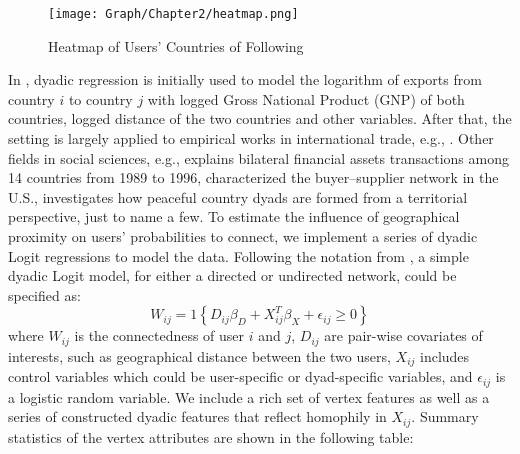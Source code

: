 \begin{figure} \centering
  \caption{Heatmap of Users' Countries of Following}
  \texttt{[image: Graph/Chapter2/heatmap.png]}
\end{figure}

In \cite{tinbergen1962shaping}, dyadic regression is initially used to model the logarithm of exports from country $i$ to country $j$ with logged Gross National Product (GNP) of both countries, logged distance of the two countries and other variables. After that, the setting is largely applied to empirical works in international trade, e.g., \cite{anderson2011gravity, rose2004we}. Other fields in social sciences, e.g., \cite{portes2005determinants} explains bilateral financial assets transactions among 14 countries from 1989 to 1996, \cite{atalay2011network} characterized the buyer–supplier network in the U.S., \cite{owsiak2021peaceful} investigates how peaceful country dyads are formed from a territorial perspective, just to name a few. To estimate the influence of geographical proximity on users' probabilities to connect, we implement a series of dyadic Logit regressions to model the data. Following the notation from \cite{de2020econometric}, a simple dyadic Logit model, for either a directed or undirected network, could be specified as:
\begin{equation}
  \nonumber
  W_{ij}=1\left\{ D_{ij} \beta_D + X_{ij}^T \beta_X + \epsilon_{ij} \geq 0 \right\}
\end{equation}
where $W_{ij}$ is the connectedness of user $i$ and $j$, $D_{ij}$ are pair-wise covariates of interests, such as geographical distance between the two users, $X_{ij}$ includes control variables which could be user-specific or dyad-specific variables, and $\epsilon_{ij}$ is a logistic random variable. We include a rich set of vertex features as well as a series of constructed dyadic features that reflect homophily in $X_{ij}$. Summary statistics of the vertex attributes are shown in the following table:

